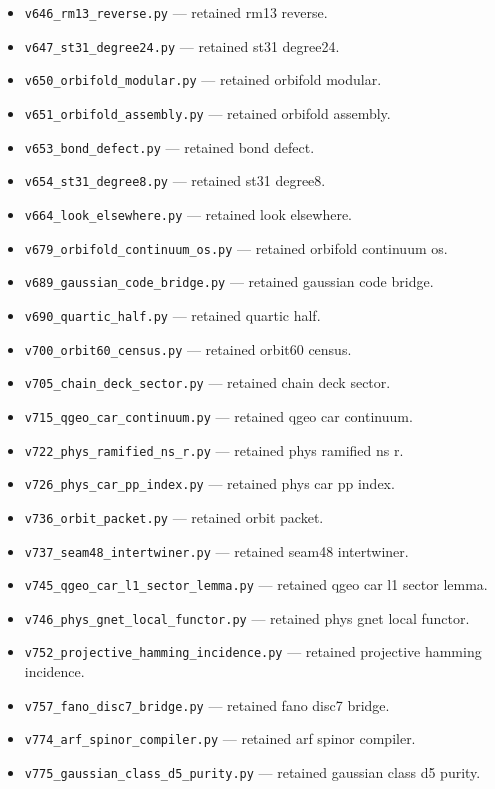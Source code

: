 \documentclass[11pt]{article}
\begin{document}
\begin{itemize}[leftmargin=2em,itemsep=1pt]
\item \texttt{v646\_rm13\_reverse.py} --- retained rm13 reverse.
\item \texttt{v647\_st31\_degree24.py} --- retained st31 degree24.
\item \texttt{v650\_orbifold\_modular.py} --- retained orbifold modular.
\item \texttt{v651\_orbifold\_assembly.py} --- retained orbifold assembly.
\item \texttt{v653\_bond\_defect.py} --- retained bond defect.
\item \texttt{v654\_st31\_degree8.py} --- retained st31 degree8.
\item \texttt{v664\_look\_elsewhere.py} --- retained look elsewhere.
\item \texttt{v679\_orbifold\_continuum\_os.py} --- retained orbifold continuum os.
\item \texttt{v689\_gaussian\_code\_bridge.py} --- retained gaussian code bridge.
\item \texttt{v690\_quartic\_half.py} --- retained quartic half.
\item \texttt{v700\_orbit60\_census.py} --- retained orbit60 census.
\item \texttt{v705\_chain\_deck\_sector.py} --- retained chain deck sector.
\item \texttt{v715\_qgeo\_car\_continuum.py} --- retained qgeo car continuum.
\item \texttt{v722\_phys\_ramified\_ns\_r.py} --- retained phys ramified ns r.
\item \texttt{v726\_phys\_car\_pp\_index.py} --- retained phys car pp index.
\item \texttt{v736\_orbit\_packet.py} --- retained orbit packet.
\item \texttt{v737\_seam48\_intertwiner.py} --- retained seam48 intertwiner.
\item \texttt{v745\_qgeo\_car\_l1\_sector\_lemma.py} --- retained qgeo car l1 sector lemma.
\item \texttt{v746\_phys\_gnet\_local\_functor.py} --- retained phys gnet local functor.
\item \texttt{v752\_projective\_hamming\_incidence.py} --- retained projective hamming incidence.
\item \texttt{v757\_fano\_disc7\_bridge.py} --- retained fano disc7 bridge.
\item \texttt{v774\_arf\_spinor\_compiler.py} --- retained arf spinor compiler.
\item \texttt{v775\_gaussian\_class\_d5\_purity.py} --- retained gaussian class d5 purity.

\end{itemize}
\end{document}
